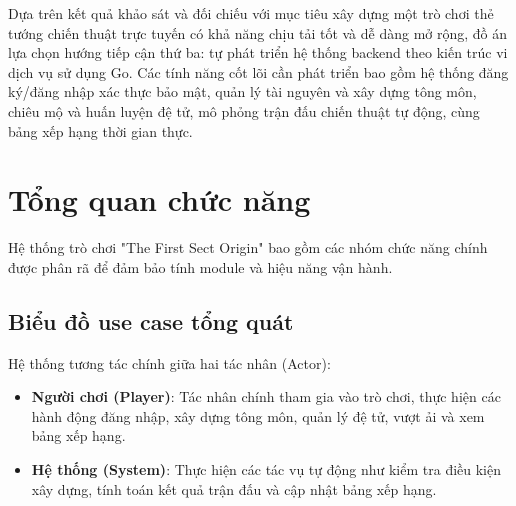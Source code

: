 \documentclass[../Project.tex]{subfiles}
\begin{document}
Dựa trên kết quả khảo sát và đối chiếu với mục tiêu xây dựng một trò chơi thẻ tướng chiến thuật trực tuyến có khả năng chịu tải tốt và dễ dàng mở rộng, đồ án lựa chọn hướng tiếp cận thứ ba: tự phát triển hệ thống backend theo kiến trúc vi dịch vụ sử dụng Go. Các tính năng cốt lõi cần phát triển bao gồm hệ thống đăng ký/đăng nhập xác thực bảo mật, quản lý tài nguyên và xây dựng tông môn, chiêu mộ và huấn luyện đệ tử, mô phỏng trận đấu chiến thuật tự động, cùng bảng xếp hạng thời gian thực.

\section{Tổng quan chức năng}
Hệ thống trò chơi "The First Sect Origin" bao gồm các nhóm chức năng chính được phân rã để đảm bảo tính module và hiệu năng vận hành.

\subsection{Biểu đồ use case tổng quát}
Hệ thống tương tác chính giữa hai tác nhân (Actor):
\begin{itemize}
    \item \textbf{Người chơi (Player)}: Tác nhân chính tham gia vào trò chơi, thực hiện các hành động đăng nhập, xây dựng tông môn, quản lý đệ tử, vượt ải và xem bảng xếp hạng.
    \item \textbf{Hệ thống (System)}: Thực hiện các tác vụ tự động như kiểm tra điều kiện xây dựng, tính toán kết quả trận đấu và cập nhật bảng xếp hạng.
\end{itemize}
\end{document}
